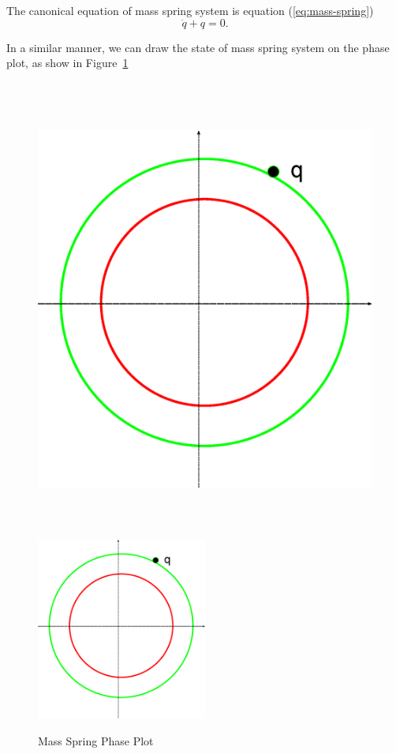 The canonical equation of mass spring system is equation (\ref{eq:mass-spring})
\begin{equation}
\label{eq:mass-spring}
\ddot{q}+q=0.
\end{equation}

In a similar manner, we can draw the state of mass spring system on the phase plot, as show in Figure~\ref{fig:massSpringPhasePlot}


\begin{figure}[!htbp]
  \begin{center}
    \leavevmode
    \ifpdf
      \includegraphics[height=6in]{MassSpringPhasePlot}
    \else
      \includegraphics[width=0.5\textwidth]{MassSpringPhasePlot}
    \fi
    \caption{Mass Spring Phase Plot}
    \label{fig:massSpringPhasePlot}
  \end{center}
\end{figure}

